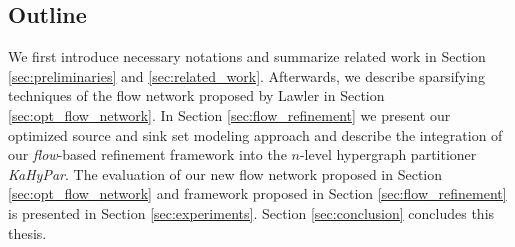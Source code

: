 \subsection{Outline}

We first introduce necessary notations and summarize related work in Section \ref{sec:preliminaries}
and \ref{sec:related_work}. Afterwards, we describe sparsifying techniques of the flow network
proposed by Lawler \cite{lawler1973} in Section \ref{sec:opt_flow_network}. In Section
\ref{sec:flow_refinement} we present our optimized source and sink set modeling
approach and describe the integration of our \emph{flow}-based refinement framework into
the $n$-level hypergraph partitioner \emph{KaHyPar}. The evaluation of our new flow network
proposed in Section \ref{sec:opt_flow_network} and framework proposed in Section 
\ref{sec:flow_refinement} is presented in Section \ref{sec:experiments}. 
Section \ref{sec:conclusion} concludes this thesis.